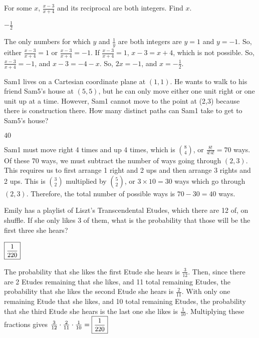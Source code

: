 \documentclass[11pt]{article}
\begin{document}
\begin{problem}
For some $x$, $\frac{x - 3}{x + 4}$ and its reciprocal are both integers. Find $x$.
\end{problem}
\begin{answer}
$\boxed{-\frac{1}{2}}$
\end{answer}
\begin{solution}
The only numbers for which $y$ and $\frac{1}{y}$ are both integers are $y = 1$ and $y = -1$. So, either $\frac{x - 3}{x + 4} = 1$ or $\frac{x - 3}{x + 4} = -1$. If $\frac{x - 3}{x + 4} = 1$, $x - 3 = x + 4$, which is not possible.
So, $\frac{x - 3}{x + 4} = -1$, and $x - 3 = -4 - x$. So, $2x = -1$, and $x = \boxed{-\frac{1}{2}}$.
\end{solution}

\begin{problem} %
Sam1 lives on a Cartesian coordinate plane at $(1,1)$. He wants to walk to his friend Sam5's house at $(5,5)$, but he can only move either one unit right or one unit up at a time. However, Sam1 cannot move to the point at (2,3) because there is construction there. How many distinct paths can Sam1 take to get to Sam5's house?
\end{problem}
\begin{answer}
$\boxed{40}$
\end{answer}
\begin{solution}
Sam1 must move right 4 times and up 4 times, which is $8 \choose 4$, or $\frac{8!}{4!4!} = 70$ ways. Of these 70 ways, we must subtract the number of ways going through $(2,3)$. This requires us to first arrange 1 right and 2 ups and then arrange 3 rights and 2 ups. This is $3 \choose 2$ multiplied by $5 \choose 2$, or $3 \times 10 = 30$ ways which go through $(2,3)$. Therefore, the total number of possible ways is $70-30 = \boxed{40}$ ways.
\end{solution}

\begin{problem} %
Emily has a playlist of Liszt's Transcendental Etudes, which there are 12 of, on shuffle. If she only likes 3 of them, what is the probability that those will be the first three she hears?
\end{problem}
\begin{answer}
$\small\boxed{\frac{1}{220}\normalsize}$
\end{answer}
\begin{solution}
The probability that she likes the first Etude she hears is $\frac{3}{12}$. Then, since there are 2 Etudes remaining that she likes, and 11 total remaining Etudes, the probability that she likes the second Etude she hears is $\frac{2}{11}$. With only one remaining Etude that she likes, and 10 total remaining Etudes, the probability that she third Etude she hears is the last one she likes is $\frac{1}{10}$. Multiplying these fractions gives $\frac{3}{12}\cdot\frac{2}{11}\cdot\frac{1}{10}=\small\boxed{\frac{1}{220}\normalsize}$
\end{solution}
\end{document}
